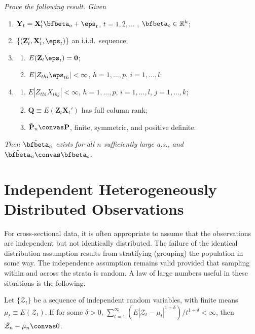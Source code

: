 \begin{exercises}
\item\label{ex:iv-iid} \emph{Prove the following result. Given}
\begin{enumerate}[label=(\roman*)]
\item $\mathbf{Y}_t = \mathbf{X}_t' \bfbeta_o + \eps_t$, \quad $t = 1, 2, \ldots$ , $\bfbeta_o \in \mathbb{R}^k$;
\item $\{(\mathbf{Z}_t', \mathbf{X}_t', \eps_t)\}$ an i.i.d.\ sequence;
\item \begin{enumerate}[label=(\alph*)]
\item $E(\mathbf{Z}_t \eps_t) = \mathbf{0}$;
\item $E|Z_{thi} \eps_{th}| < \infty$, $h = 1, \ldots, p$, $i = 1, \ldots, l$;
\end{enumerate}
\item \begin{enumerate}[label=(\alph*)]
\item $E|Z_{thi} X_{thj}| < \infty$, $h = 1, \ldots, p$, $i = 1, \ldots, l$, $j = 1, \ldots, k$;
\item $\mathbf{Q} \equiv E(\mathbf{Z}_t \mathbf{X}_t')$ has full column rank;
\item $\hat{\mathbf{P}}_n \convas \mathbf{P}$, finite, symmetric, and positive definite.
\end{enumerate}
\end{enumerate}
\emph{Then $\tilde{\bfbeta}_n$ exists for all $n$ sufficiently large a.s., and $\tilde{\bfbeta}_n \convas \bfbeta_o$.}
\end{exercises}

\section{Independent Heterogeneously Distributed Observations}\label{sec:lln-ind-het}

For cross-sectional data, it is often appropriate to assume that the observations are independent but not identically distributed. The failure of the identical distribution assumption results from stratifying (grouping) the population in some way. The independence assumption remains valid provided that sampling within and across the strata is random. A law of large numbers useful in these situations is the following.

\begin{theorem}[Markov]\label{thm:markov-lln}
Let $\{\mathcal{Z}_t\}$ be a sequence of independent random variables, with finite means $\mu_t \equiv E(\mathcal{Z}_t)$. If for some $\delta > 0$, $\sum_{t=1}^{\infty} (E|\mathcal{Z}_t - \mu_t|^{1+\delta})/t^{1+\delta} < \infty$, then $\bar{\mathcal{Z}}_n - \bar{\mu}_n \convas 0$.
\end{theorem}

